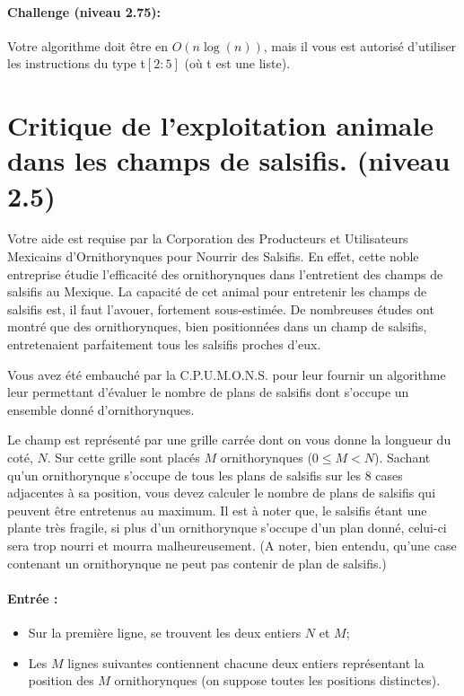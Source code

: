 \documentclass[a4paper]{article}
\begin{document}
\paragraph{Challenge (niveau 2.75): }
Votre algorithme doit être en $O(n \log (n))$, mais il vous est autorisé d'utiliser les instructions du type t$[2:5]$ (où t est une liste).


\section{Critique de l'exploitation animale dans les champs de salsifis. (niveau 2.5)}

Votre aide est requise par la Corporation des Producteurs et Utilisateurs Mexicains d'Ornithorynques pour Nourrir des Salsifis. En effet, cette noble entreprise étudie l'efficacité des ornithorynques dans l'entretient des champs de salsifis au Mexique. La capacité de cet animal pour entretenir les champs de salsifis est, il faut l'avouer, fortement sous-estimée. De nombreuses études ont montré que des ornithorynques, bien positionnées dans un champ de salsifis, entretenaient parfaitement tous les salsifis proches d'eux.

Vous avez été embauché par la C.P.U.M.O.N.S. pour leur fournir un algorithme leur permettant d'évaluer le nombre de plans de salsifis dont s'occupe un ensemble donné d'ornithorynques.

Le champ est représenté par une grille carrée dont on vous donne la longueur du coté, $N$. Sur cette grille sont placés $M$ ornithorynques ($0 \leqslant M < N$). Sachant qu'un ornithorynque s'occupe de tous les plans de salsifis sur les 8 cases adjacentes à sa position, vous devez calculer le nombre de plans de salsifis qui peuvent être entretenus au maximum. Il est à noter que, le salsifis étant une plante très fragile, si plus d'un ornithorynque s'occupe d'un plan donné, celui-ci sera trop nourri et mourra malheureusement. (A noter, bien entendu, qu'une case contenant un ornithorynque ne peut pas contenir de plan de salsifis.)

\paragraph{Entrée :}
\begin{itemize}
\item Sur la première ligne, se trouvent les deux entiers $N$ et $M$;
\item Les $M$ lignes suivantes contiennent chacune deux entiers représentant la position des $M$ ornithorynques (on suppose toutes les positions distinctes).
\end{itemize}
\end{document}
